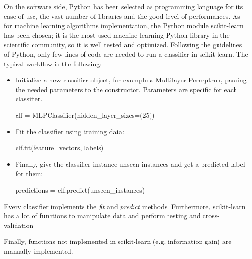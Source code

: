 \documentclass[a4paper, 10pt]{article}
\begin{document}
On the software side, Python has been selected as programming language for its ease of use, the vast number of libraries and the good level of performances. As for machine learning algorithms implementation, the Python module \href{http://scikit-learn.org/}{scikit-learn} has been chosen; it is the most used machine learning Python library in the scientific community, so it is well tested and optimized. Following the guidelines of Python, only few lines of code are needed to run a classifier in scikit-learn. The typical workflow is the following:
\begin{itemize}
	\item Initialize a new classifier object, for example a Multilayer Perceptron, passing the needed parameters to the constructor. Parameters are specific for each classifier.
	\begin{center}
		\selectfont
		clf = MLPClassifier(hidden\_layer\_sizes=(25))
	\end{center}

	\item Fit the classifier using training data:
		\begin{center}
		\selectfont
		clf.fit(feature\_vectors, labels)
		\end{center}
	
	\item Finally, give the classifier instance unseen instances and get a predicted label for them:
		\begin{center}
		\selectfont
		predictions = clf.predict(unseen\_instances)
		\end{center}
\end{itemize}

Every classifier implements the \emph{fit} and \emph{predict} methods. Furthermore, scikit-learn has a lot of functions to manipulate data and perform testing and cross-validation.

Finally, functions not implemented in scikit-learn (e.g. information gain) are manually implemented.
\end{document}
